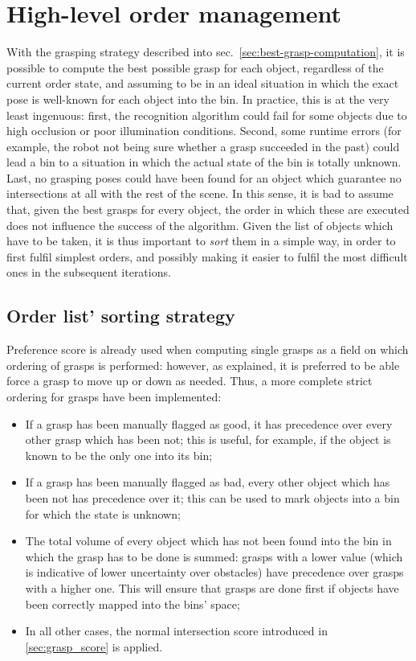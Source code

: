 \section{High-level order management} \label{sec:order-list}
With the grasping strategy described into
sec.~\ref{sec:best-grasp-computation}, it is possible to compute the
best possible grasp for each object, regardless of the current order
state, and assuming to be in an ideal situation in which the exact
pose is well-known for each object into the bin. In practice, this is
at the very least ingenuous: first, the recognition algorithm could
fail for some objects due to high occlusion or poor illumination
conditions. Second, some runtime errors (for example, the robot not
being sure whether a grasp succeeded in the past) could lead a bin to a
situation in which the actual state of the bin is totally
unknown. Last, no grasping poses could have been found for an object
which guarantee no intersections at all with the rest of the scene. In
this sense, it is bad to assume that, given the best grasps for every
object, the order in which these are executed does not influence the
success of the algorithm. Given the list of objects which have to be
taken, it is thus important to \emph{sort} them in a simple way, in
order to first fulfil simplest orders, and possibly making it easier
to fulfil the most difficult ones in the subsequent iterations.

\subsection{Order list' sorting strategy} \label{sec:sort-order}
Preference score is already used when computing single grasps as a field on which ordering of
grasps is performed: however, as explained, it is preferred to be able
force a grasp to move up or down as needed. Thus, a more complete strict
ordering for grasps have been implemented:
\begin{itemize}
\item {If a grasp has been manually flagged as good, it has
  precedence over every other grasp which has been not; this is
  useful, for example, if the object is known to be the only one into
  its bin;}
\item{If a grasp has been manually flagged as bad, every other object
  which has been not has precedence over it; this can be used to mark
  objects into a bin for which the state is unknown;}
\item{The total volume of every object which has not been found into
  the bin in which the grasp has to be done is summed: grasps with a
  lower value (which is indicative of lower uncertainty over
  obstacles) have precedence over grasps with a higher one. This
  will ensure that grasps are done first if objects have been
  correctly mapped into the bins' space;}
\item{In all other cases, the normal intersection score introduced
  in \ref{sec:grasp_score} is applied.}
\end{itemize}

